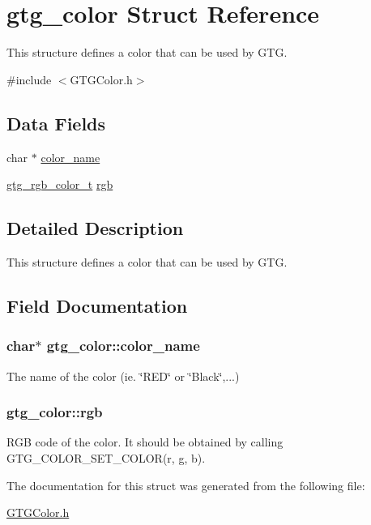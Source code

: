 \hypertarget{structgtg__color}{\section{gtg\-\_\-color Struct Reference}
\label{structgtg__color}
}


This structure defines a color that can be used by G\-T\-G.  




{\ttfamily \#include $<$G\-T\-G\-Color.\-h$>$}

\subsection*{Data Fields}
{\bf }\par
\begin{DoxyCompactItemize}
\item 
char $\ast$ \hyperlink{structgtg__color_a7c2033bde700bdbf9fb1be5c6b2400e8}{color\-\_\-name}
\item 
\hyperlink{GTGColor_8h_a9fd3b22fc2eca7706659486c53aa1edd}{gtg\-\_\-rgb\-\_\-color\-\_\-t} \hyperlink{structgtg__color_a1c158621053c8150b40751340e4e47f2}{rgb}
\end{DoxyCompactItemize}



\subsection{Detailed Description}
This structure defines a color that can be used by G\-T\-G. 

\subsection{Field Documentation}
\hypertarget{structgtg__color_a7c2033bde700bdbf9fb1be5c6b2400e8}{
\subsubsection[{color\-\_\-name}]{\setlength{\rightskip}{0pt plus 5cm}char$\ast$ gtg\-\_\-color\-::color\-\_\-name}}\label{structgtg__color_a7c2033bde700bdbf9fb1be5c6b2400e8}
The name of the color (ie. \char`\"{}\-R\-E\-D\char`\"{} or \char`\"{}\-Black\char`\"{},...) \hypertarget{structgtg__color_a1c158621053c8150b40751340e4e47f2}{
\subsubsection[{rgb}]{ gtg\-\_\-color\-::rgb}}\label{structgtg__color_a1c158621053c8150b40751340e4e47f2}
R\-G\-B code of the color. It should be obtained by calling G\-T\-G\-\_\-\-C\-O\-L\-O\-R\-\_\-\-S\-E\-T\-\_\-\-C\-O\-L\-O\-R(r, g, b). 

The documentation for this struct was generated from the following file\-:\begin{DoxyCompactItemize}
\item 
\hyperlink{GTGColor_8h}{G\-T\-G\-Color.\-h}\end{DoxyCompactItemize}
